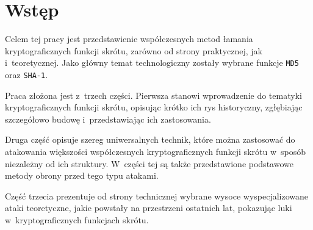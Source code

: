 \section{Wstęp}
Celem tej pracy jest przedstawienie współczesnych metod łamania
kryptograficznych funkcji skrótu, zarówno od strony praktycznej, jak
i~teoretycznej. Jako główny temat technologiczny zostały wybrane funkcje
\texttt{MD5} oraz \texttt{SHA-1}.

Praca złożona jest z~trzech części. Pierwsza stanowi wprowadzenie do tematyki
kryptograficznych funkcji skrótu, opisując krótko ich rys historyczny,
zgłębiając szczegółowo budowę i~przedstawiając ich zastosowania.

Druga część opisuje szereg uniwersalnych technik, które można zastosować do
atakowania większości współczesnych kryptograficznych funkcji skrótu w~sposób
niezależny od ich struktury. W~części tej są także przedstawione podstawowe
metody obrony przed tego typu atakami.

Część trzecia prezentuje od strony technicznej wybrane wysoce wyspecjalizowane
ataki teoretyczne, jakie powstały na przestrzeni ostatnich lat, pokazując luki
w~kryptograficznych funkcjach skrótu.
